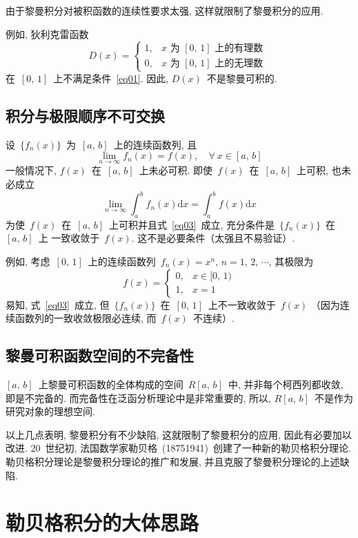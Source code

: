 由于黎曼积分对被积函数的连续性要求太强, 这样就限制了黎曼积分的应用.

例如, 狄利克雷函数
\[
D(x) = \left\{ \!\!
\begin{array}{ll}
1, & x \mbox{~为~} [0,\,1] \mbox{~上的有理数~} \\
0, & x \mbox{~为~} [0,\,1] \mbox{~上的无理数~}
\end{array}
\right.
\]
在~$[0,\,1]$~上不满足条件~\eqref{eq01}. 因此, $D(x)$~不是黎曼可积的.

\subsection*{积分与极限顺序不可交换}

设~$\{f_n(x)\}$~为~$[a,\,b]$~上的连续函数列, 且
\[
\lim_{n \to \infty} f_n(x) = f(x), \quad \forall~x \in [a,\,b]
\]
一般情况下, $f(x)$~在~$[a,\,b]$~上未必可积. 即使~$f(x)$~在~$[a,\,b]$~上可积, 也未必成立
\begin{equation} \label{eq03}
\lim_{n \to \infty} \int_a ^b \!\! f_n(x) \mathrm{d}x = \int_a ^b \!\! f(x) \mathrm{d}x
\end{equation}
为使~$f(x)$~在~$[a,\,b]$~上可积并且式~\eqref{eq03}~成立, 充分条件是~$\{f_n(x)\}$~在~$[a,\,b]$~上
一致收敛于~$f(x)$. 这不是必要条件（太强且不易验证）.

例如, 考虑~$[0,\,1]$~上的连续函数列~$f_n(x) = x^n, \, n = 1,\,2,\,\cdots$, 其极限为
\[
f(x) = \left\{ \!\!
\begin{array}{ll}
0, & x \in [0,\,1) \\
1, & x = 1
\end{array}
\right.
\]
易知, 式~\eqref{eq03}~成立, 但~$\{f_n(x)\}$~在~$[0,\,1]$~上不一致收敛于~$f(x)$
（因为连续函数列的一致收敛极限必连续, 而~$f(x)$~不连续）.

\subsection*{黎曼可积函数空间的不完备性}

$[a,\,b]$~上黎曼可积函数的全体构成的空间~$R[a,\,b]$~中, 并非每个柯西列都收敛, 即是不完备的.
而完备性在泛函分析理论中是非常重要的, 所以, $R[a,\,b]$~不是作为研究对象的理想空间.

以上几点表明, 黎曼积分有不少缺陷, 这就限制了黎曼积分的应用, 因此有必要加以改进.
20~世纪初, 法国数学家勒贝格~(1875\raisebox{0.5mm}{--}1941)~创建了一种新的勒贝格积分理论.
勒贝格积分理论是黎曼积分理论的推广和发展, 并且克服了黎曼积分理论的上述缺陷.

\section{勒贝格积分的大体思路}


